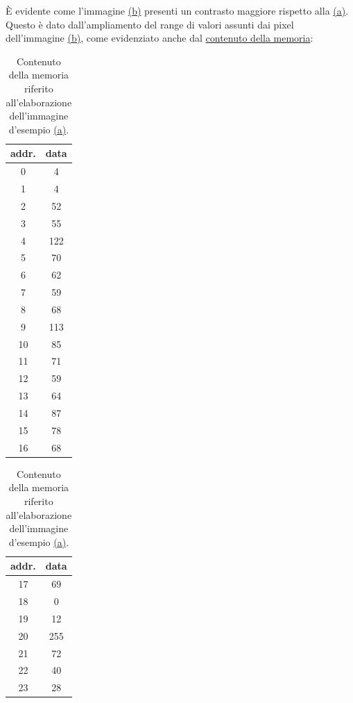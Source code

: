 \documentclass{article}
\begin{document}
\pagebreak

È evidente come l'immagine \hyperref[fig:esempioFIG]{\small (b)} presenti un contrasto maggiore rispetto alla \hyperref[fig:esempioFIG]{\small (a)}.
Questo è dato dall'ampliamento del range di valori assunti dai pixel dell'immagine \hyperref[fig:esempioFIG]{\small (b)}, come evidenziato anche dal \hyperref[tab:esMEM]{contenuto della memoria}:
\vspace{0,2cm}

\begin{table}[h]
    \centering
    \caption{Contenuto della memoria riferito all'elaborazione dell'immagine d'esempio \hyperref[fig:esempioFIG]{\small (a)}.}
    \label{tab:esMEM}
    \begin{tabular}{c|c}
        addr. & data \\
        \hline \hline
        0     & 4    \\
        1     & 4    \\
        2     & 52   \\
        3     & 55   \\
        4     & 122  \\
        5     & 70   \\
        6     & 62   \\
        7     & 59   \\
        8     & 68   \\
        9     & 113  \\
        10    & 85   \\
        11    & 71   \\
        12    & 59   \\
        13    & 64   \\
        14    & 87   \\
        15    & 78   \\
        16    & 68   \\
    \end{tabular}\hspace{15pt}
    \begin{tabular}{c|c}
        addr. & data \\
        \hline \hline
        17    & 69   \\
        18    & 0    \\
        19    & 12   \\
        20    & 255  \\
        21    & 72   \\
        22    & 40   \\
        23    & 28   \\

\end{tabular}
\end{table}
\end{document}
